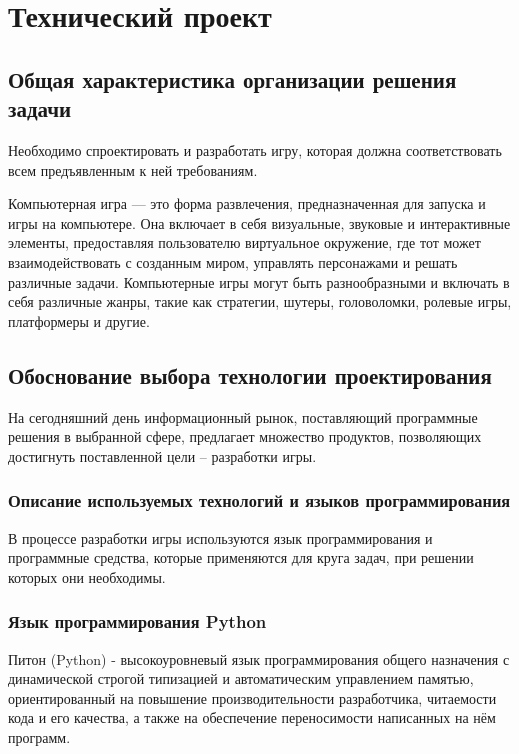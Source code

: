\section{Технический проект}
\subsection{Общая характеристика организации решения задачи}

Необходимо спроектировать и разработать игру, которая должна соответствовать всем предъявленным к ней требованиям.

Компьютерная игра — это форма развлечения, предназначенная для запуска и игры на компьютере. Она включает в себя визуальные, звуковые и интерактивные элементы, предоставляя пользователю виртуальное окружение, где тот может взаимодействовать с созданным миром, управлять персонажами и решать различные задачи. Компьютерные игры могут быть разнообразными и включать в себя различные жанры, такие как стратегии, шутеры, головоломки, ролевые игры, платформеры и другие.

\subsection{Обоснование выбора технологии проектирования}

На сегодняшний день информационный рынок, поставляющий программные решения в выбранной сфере, предлагает множество продуктов, позволяющих достигнуть поставленной цели – разработки игры.

\subsubsection{Описание используемых технологий и языков программирования}

В процессе разработки игры используются язык программирования и программные средства, которые применяются для круга задач, при решении которых они необходимы.

\subsubsection{Язык программирования Python}

Питон (Python) - высокоуровневый язык программирования общего назначения с динамической строгой типизацией и автоматическим управлением памятью, ориентированный на повышение производительности разработчика, читаемости кода и его качества, а также на обеспечение переносимости написанных на нём программ.

